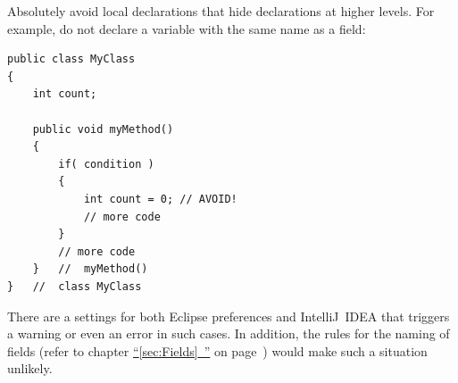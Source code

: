 \documentclass[11pt,a4paper, titlepage, parskip=half, headsepline, footsepline, cleardoublepage=current, headheight=1cm]{scrbook}
\newcommand*{\tqfullvref}[1]{\hyperref[{#1}]{“\ref*{#1}~\nameref*{#1}”} on page~\pageref{#1}}
\begin{document}
\begin{lstlisting}[numbers=left]
\end{lstlisting}



Absolutely avoid local declarations that hide declarations at higher levels. For example, do not declare a variable with the same name as a field:
\begin{lstlisting}
public class MyClass
{
    int count;

    public void myMethod()
    {
        if( condition )
        {
            int count = 0; // AVOID!
            // more code
        }
        // more code
    }   //  myMethod()
}   //  class MyClass
\end{lstlisting}
There are a settings for both Eclipse preferences and IntelliJ~IDEA that triggers a warning or even an error in such cases. In addition, the rules for the naming of fields (refer to chapter \tqfullvref{sec:Fields}) would make such a situation unlikely.
\end{document}
